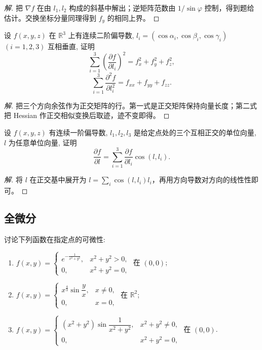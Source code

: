 \documentclass[../../数学分析培优讲义(答案版).tex]{subfiles}
\begin{document}
\begin{proof}[解]
把 $\nabla f$ 在由 $l_1,l_2$ 构成的斜基中解出；逆矩阵范数由 $1/\sin\varphi$ 控制，得到题给估计。交换坐标分量同理得到 $f_y$ 的相同上界。
\end{proof}

\begin{example}
设 $f(x,y,z)$ 在 $\mathbb{R}^3$ 上有连续二阶偏导数, $l_i=(\cos\alpha_i,\cos\beta_i,\cos\gamma_i)$ $(i=1,2,3)$ 互相垂直, 证明
\[
    \sum\limits_{i=1}^3\left(\dfrac{\partial f}{\partial l_i}\right)^2
    =f_x^2+f_y^2+f_z^2,
\]
\[
    \sum\limits_{i=1}^3\dfrac{\partial^2f}{\partial l_i^2}
    =f_{xx}+f_{yy}+f_{zz}.
\]
\end{example}

\begin{proof}[解]
把三个方向余弦作为正交矩阵的行。第一式是正交矩阵保持向量长度；第二式把 Hessian 作正交相似变换后取迹，迹不变即得。
\end{proof}

\begin{example}[\markstar]
设 $f(x,y,z)$ 有连续一阶偏导数, $l_1,l_2,l_3$ 是给定点处的三个互相正交的单位向量, $l$ 为任意单位向量, 证明
\[
    \dfrac{\partial f}{\partial l}
    =\sum\limits_{i=1}^3\dfrac{\partial f}{\partial l_i}\cos(l,l_i).
\]
\end{example}

\begin{proof}[解]
将 $l$ 在正交基中展开为 $l=\sum_i\cos(l,l_i)l_i$，再用方向导数对方向的线性性即可。
\end{proof}

\subsection{全微分}

\begin{example}
讨论下列函数在指定点的可微性:
\begin{enumerate}[label=(\arabic*)]
    \item $\displaystyle f(x,y)=\begin{cases}e^{-\frac{1}{x^2+y^2}},&x^2+y^2>0,\\0,&x^2+y^2=0,\end{cases}$ 在 $(0,0)$;
    \item $\displaystyle f(x,y)=\begin{cases}x^{\frac{4}{3}}\sin\dfrac{y}{x},&x\ne0,\\0,&x=0,\end{cases}$ 在 $\mathbb{R}^2$;
    \item $\displaystyle f(x,y)=\begin{cases}(x^2+y^2)\sin\dfrac{1}{x^2+y^2},&x^2+y^2\ne0,\\0,&x^2+y^2=0,\end{cases}$ 在 $(0,0)$.
\end{enumerate}
\end{example}
\end{document}
